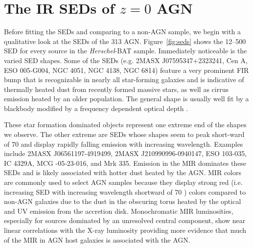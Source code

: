 \documentclass[fleqn, usenatbib]{mnras}
\newcommand{\herschel}{\emph{Herschel}}
\newcommand{\msun}{M$_{\sun}$}
\newcommand{\mstar}{$M_{\mathrm{star}}$}
\begin{document}


\section{The IR SEDs of $z=0$ AGN}\label{sec:ir_seds}

Before fitting the SEDs and comparing to a non-AGN sample, we begin with a qualitative look at the SEDs of the 313 AGN. Figure~\ref{fig:seds} shows the 12--500 \micron{} SED for every source in the \herschel-BAT sample. Immediately noticeable is the varied SED shapes. Some of the SEDs (e.g. 2MASX J07595347+2323241, Cen A, ESO 005-G004, NGC 4051, NGC 4138, NGC 6814) feature a very prominent FIR bump that is recognizable in nearly all star-forming galaxies and is indicative of thermally heated dust from recently formed massive stars, as well as cirrus emission heated by an older population. The general shape is usually well fit by a blackbody modified by a frequency dependent optical depth \citep[e.g.][]{Calzetti:2000fk, Smith:2012fj, Bianchi:2013jk, Symeonidis:2013fe, Cortese:2014qq}.

These star formation dominated objects represent one extreme end of the shapes we observe. The other extreme are SEDs whose shapes seem to peak short-ward of 70 \micron{} and display rapidly falling emission with increasing wavelength. Examples include 2MASX J06561197-4919499, 2MASX J210990996-0940147, ESO 103-035, IC 4329A, MCG -05-23-016, and Mrk 335. Emission in the MIR dominates these SEDs and is likely associated with hotter dust heated by the AGN. MIR colors are commonly used to select AGN samples because they display strong red (i.e. increasing SED with increasing wavelength shortward of 70 \micron) colors compared to non-AGN galaxies \citep{Lacy:2004uq, Donley:2012qy, Stern:2012mz} due to the dust in the obscuring torus heated by the optical and UV emission from the accretion disk. Monochromatic MIR luminosities, especially for sources dominated by an unresolved central component, show near linear correlations with the X-ray luminosity \citep[e.g][]{Lutz:2004fj, Gandhi:2009kx, Asmus:2015qy} providing more evidence that much of the MIR in AGN host galaxies is associated with the AGN. 
\end{document}
